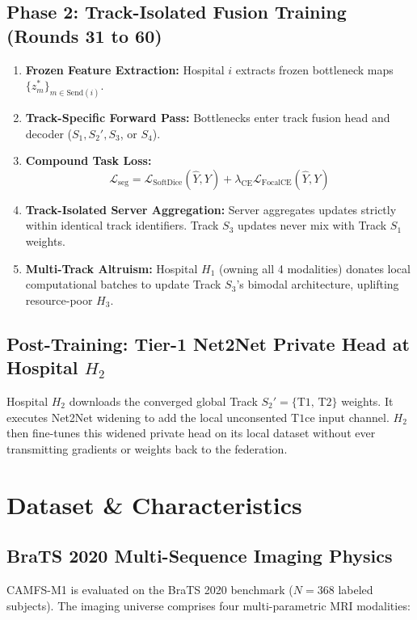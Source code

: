 \documentclass[10pt,a4paper]{article}
\begin{document}
\subsection{Phase 2: Track-Isolated Fusion Training (Rounds 31 to 60)}
\begin{enumerate}[itemsep=1pt, topsep=1pt]
    \item \textbf{Frozen Feature Extraction:} Hospital $i$ extracts frozen bottleneck maps $\{z_m^*\}_{m \in \text{Send}(i)}$.
    \item \textbf{Track-Specific Forward Pass:} Bottlenecks enter track fusion head and decoder ($S_1, S_2', S_3$, or $S_4$).
    \item \textbf{Compound Task Loss:}
    \begin{equation}
        \mathcal{L}_{\text{seg}} = \mathcal{L}_{\text{SoftDice}}(\hat{Y}, Y) + \lambda_{\text{CE}} \mathcal{L}_{\text{FocalCE}}(\hat{Y}, Y)
    \end{equation}
    \item \textbf{Track-Isolated Server Aggregation:} Server aggregates updates strictly within identical track identifiers. Track $S_3$ updates never mix with Track $S_1$ weights.
    \item \textbf{Multi-Track Altruism:} Hospital $H_1$ (owning all 4 modalities) donates local computational batches to update Track $S_3$'s bimodal architecture, uplifting resource-poor $H_3$.
\end{enumerate}

\subsection{Post-Training: Tier-1 Net2Net Private Head at Hospital \texorpdfstring{$H_2$}{H2}}
Hospital $H_2$ downloads the converged global Track $S_2' = \{\text{T1, T2}\}$ weights. It executes Net2Net widening to add the local unconsented $\text{T1ce}$ input channel. $H_2$ then fine-tunes this widened private head on its local dataset without ever transmitting gradients or weights back to the federation.

\section{Dataset \& Characteristics}

\subsection{BraTS 2020 Multi-Sequence Imaging Physics}
CAMFS-M1 is evaluated on the BraTS 2020 benchmark ($N = 368$ labeled subjects). The imaging universe comprises four multi-parametric MRI modalities:
\end{document}
